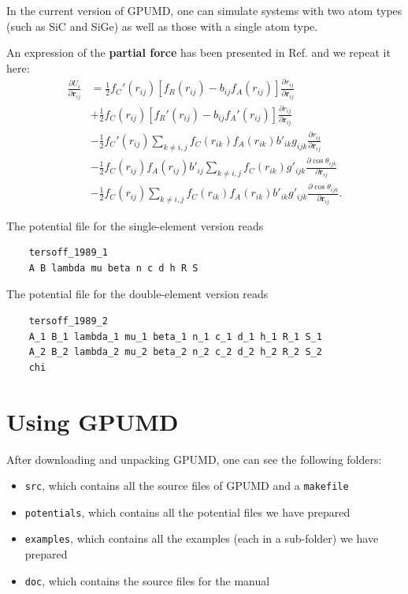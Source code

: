 \documentclass[12pt,a4paper]{report}
\newcommand{\vect}[1]{\boldsymbol{#1}}
\begin{document}
In the current version of GPUMD, one can simulate systems with two atom types (such as SiC and SiGe) as well as those with a single atom type.

An expression of the \textbf{partial force} has been presented in Ref. \cite{fan2015prb} and we repeat it here:
\begin{align}
\frac{\partial U_i}{\partial \vect{r}_{ij}}
&= \frac{1}{2}f_C'(r_{ij})[f_R(r_{ij})-b_{ij}f_A(r_{ij})]\frac{\partial r_{ij}}{\partial \vect{r}_{ij}} \nonumber \\
&+ \frac{1}{2}f_C(r_{ij})[f_R'(r_{ij})-b_{ij}f_A'(r_{ij})]\frac{\partial r_{ij}}{\partial \vect{r}_{ij}} \nonumber \\
&- \frac{1}{2}f_C'(r_{ij})\sum_{k\neq i,j}f_C(r_{ik})f_A(r_{ik})b'_{ik}g_{ijk} \frac{\partial r_{ij}}{\partial \vect{r}_{ij}} \nonumber \\
&- \frac{1}{2}f_C(r_{ij})f_A(r_{ij})b'_{ij}\sum_{k\neq i,j}f_C(r_{ik})  g'_{ijk}
   \frac{\partial \cos\theta_{ijk}}{\partial \vect{r}_{ij}} \nonumber \\
&- \frac{1}{2}f_C(r_{ij})\sum_{k\neq i,j}f_C(r_{ik})f_A(r_{ik})b'_{ik}  g'_{ijk}
   \frac{\partial \cos\theta_{ijk}}{\partial \vect{r}_{ij}}.
\end{align}


The potential file for the single-element version reads
\begin{verbatim}
    tersoff_1989_1
    A B lambda mu beta n c d h R S
\end{verbatim}
The potential file for the double-element version reads
\begin{verbatim}
    tersoff_1989_2
    A_1 B_1 lambda_1 mu_1 beta_1 n_1 c_1 d_1 h_1 R_1 S_1
    A_2 B_2 lambda_2 mu_2 beta_2 n_2 c_2 d_2 h_2 R_2 S_2
    chi
\end{verbatim}



\chapter{Using GPUMD \label{chapter:usage}}

After downloading and unpacking GPUMD, one can see the following folders:
\begin{itemize}
\item \verb"src", which contains all the source files of GPUMD and a \verb"makefile"
\item \verb"potentials", which contains all the potential files we have prepared
\item \verb"examples", which contains all the examples (each in a sub-folder) we have prepared
\item \verb"doc", which contains the source files for the manual
\end{itemize}
\end{document}
